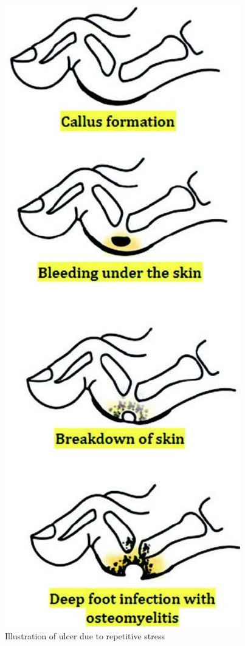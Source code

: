 \begin{figure}
\includegraphics{images/067.jpg}
\caption{Illustration of ulcer due to repetitive stress}
\end{figure}

